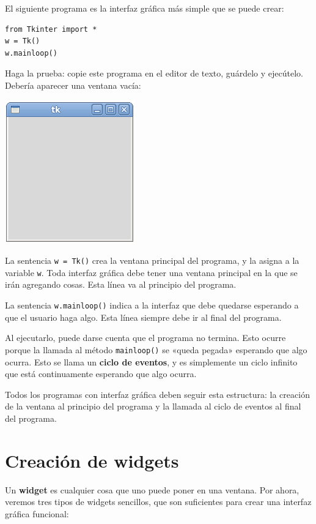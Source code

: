 El siguiente programa es la interfaz gráfica más simple que se puede
crear:
\begin{lstlisting}
from Tkinter import *
w = Tk()
w.mainloop()
\end{lstlisting}

Haga la prueba: copie este programa en el editor de texto, guárdelo y
ejecútelo. Debería aparecer una ventana vacía:

\includegraphics[scale=.5]{../diapos/programas/tkinter/capturas/01.png}

La sentencia \lstinline!w = Tk()! crea la ventana principal del
programa, y la asigna a la variable \lstinline!w!. Toda interfaz gráfica
debe tener una ventana principal en la que se irán agregando cosas. Esta
línea va al principio del programa.

La sentencia \lstinline!w.mainloop()! indica a la interfaz que debe
quedarse esperando a que el usuario haga algo. Esta línea siempre debe
ir al final del programa.

Al ejecutarlo, puede darse cuenta que el programa no termina. Esto
ocurre porque la llamada al método \lstinline!mainloop()! se «queda
pegada» esperando que algo ocurra. Esto se llama un \textbf{ciclo de
eventos}, y es simplemente un ciclo infinito que está continuamente
esperando que algo ocurra.

Todos los programas con interfaz gráfica deben seguir esta estructura:
la creación de la ventana al principio del programa y la llamada al
ciclo de eventos al final del programa.

\section{Creación de widgets}

Un \textbf{widget} es cualquier cosa que uno puede poner en una ventana.
Por ahora, veremos tres tipos de widgets sencillos, que son suficientes
para crear una interfaz gráfica funcional:

